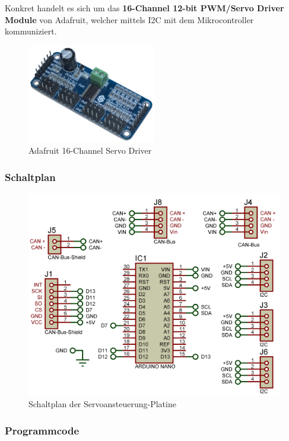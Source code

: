 Konkret handelt es sich um das \textbf{16-Channel 12-bit PWM/Servo Driver Module} von Adafruit, welcher mittels I2C mit dem Mikrocontroller kommuniziert.\\
\begin{figure}[h]
    \centering
    \includegraphics[width=0.5\textwidth]{Fotos/Servo_Controller.png}
    \caption{Adafruit 16-Channel Servo Driver}
\end{figure}

\newpage
\subsubsection{Schaltplan}
\begin{figure}[h]
    \centering
    \includegraphics[width=1.0\textwidth]{../Proteus/Exports/Servos-Platine.png}    
    \caption{Schaltplan der Servoansteuerung-Platine}
\end{figure}


\newpage
\subsubsection{Programmcode}

\newpage

